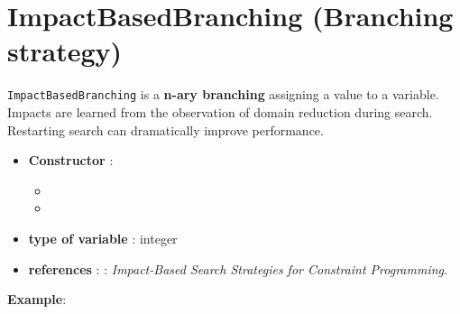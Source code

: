 \section{ImpactBasedBranching (Branching strategy)}\label{impact:impactbranchstrat}\hypertarget{impact:impactbranchstrat}{}
\begin{notedef}
  \texttt{ImpactBasedBranching} is a \textbf{n-ary branching} assigning a value to a variable. Impacts are learned from the observation of domain reduction during search. Restarting search can dramatically improve performance.
\end{notedef}

\begin{itemize}
	\item \textbf{Constructor} :
	\begin{itemize}
	\item {}
	\item {}
	\end{itemize}	
	\item \textbf{type of variable} : integer
	\item \textbf{references} : \cite{Refalo04}: \emph{Impact-Based Search Strategies for Constraint Programming}. 
\end{itemize}

\textbf{Example}:
%

